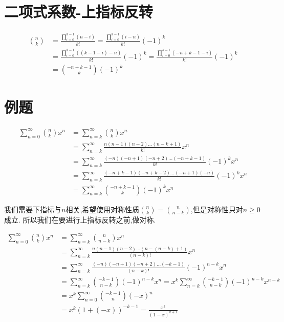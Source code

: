 \documentclass{article}
\begin{document}
\section*{二项式系数-上指标反转}
\[
	\begin{aligned}
		\binom{n}{k}
		 & =\frac{\prod_{i=0}^{k-1} (n-i)}{k!}=\frac{\prod_{i=0}^{k-1} (i-n)}{k!}{(-1)}^k                    \\
		 & =\frac{\prod_{i=0}^{k-1} ((k-1-i)-n)}{k!}{(-1)}^k=\frac{\prod_{i=0}^{k-1} (-n+k-1-i)}{k!}{(-1)}^k \\
		 & =\binom{-n+k-1}{k}{(-1)}^k
	\end{aligned}
\]

\section*{例题}

\[
	\begin{aligned}
		\sum_{n=0}^\infty \binom{n}{k}x^n
		 & =\sum_{n=k}^\infty \binom{n}{k}x^n                                          \\
		 & =\sum_{n=k}^\infty \frac{n(n-1)(n-2)\ldots (n-k+1)}{k!}x^n                  \\
		 & =\sum_{n=k}^\infty \frac{(-n)(-n+1)(-n+2)\ldots (-n+k-1)}{k!}{(-1)}^k x^n   \\
		 & =\sum_{n=k}^\infty \frac{(-n+k-1)(-n+k-2)\ldots (-n+1)(-n)}{k!}{(-1)}^k x^n \\
		 & =\sum_{n=k}^\infty \binom{-n+k-1}{k}{(-1)}^k x^n
	\end{aligned}
\]

我们需要下指标与$n$相关,希望使用对称性质$\binom{n}{k}=\binom{n}{n-k}$,但是对称性只对$n\geq 0$成立. 所以我们在要进行上指标反转之前,做对称.

\[
	\begin{aligned}
		\sum_{n=0}^\infty \binom{n}{k}x^n
		 & =\sum_{n=k}^\infty \binom{n}{n-k}x^n                                                                             \\
		 & =\sum_{n=k}^\infty \frac{n(n-1)(n-2)\ldots (n-(n-k)+1)}{(n-k)!} x^n                                             \\
		 & =\sum_{n=k}^\infty \frac{(-n)(-n+1)(-n+2)\ldots (-k-1)}{(n-k)!} {(-1)}^{n-k}x^n                                 \\
		 & =\sum_{n=k}^\infty \binom{-k-1}{n-k}{(-1)}^{n-k} x^n=x^k \sum_{n=k}^\infty \binom{-k-1}{n-k}{(-1)}^{n-k} x^{n-k} \\
		 & =x^k \sum_{n=0}^\infty \binom{-k-1}{n}{(-x)}^n                                                                   \\
		 & =x^k {(1+(-x))}^{-k-1}=\frac{x^k}{{(1-x)}^{k+1}}
	\end{aligned}
\]
\end{document}
